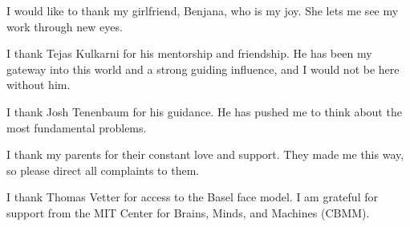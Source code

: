 I would like to thank my girlfriend, Benjana, who is my joy. She lets me
see my work through new eyes.

I thank Tejas Kulkarni for his mentorship and friendship. He has been my
gateway into this world and a strong guiding influence, and I would not
be here without him.

I thank Josh Tenenbaum for his guidance. He has pushed me to think about
the most fundamental problems.

I thank my parents for their constant love and support. They made me
this way, so please direct all complaints to them.

I thank Thomas Vetter for access to the Basel face model. I am grateful
for support from the MIT Center for Brains, Minds, and Machines (CBMM).
